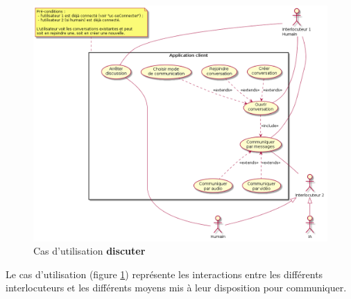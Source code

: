 \documentclass[11pt,dvipsnames,svgnames]{report}
\begin{document}
\begin{figure}[H]
\includegraphics[scale=0.55]{images/uc-discuter.png}
\caption{Cas d'utilisation \textbf{discuter}}
\label{cas1}
\end{figure}
Le cas d'utilisation (figure \ref{cas1}) représente les interactions entre les différents interlocuteurs et les différents moyens mis à leur disposition pour communiquer.
\end{document}
